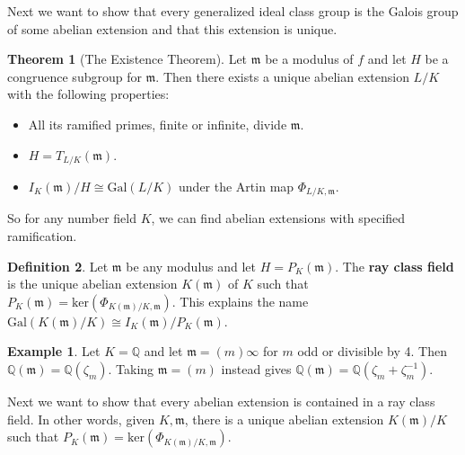 \documentclass{article}
\theoremstyle{definition}
\newtheorem{theorem}{Theorem}[section]
\newtheorem{example}{Example}[section]
\newtheorem{defn}[theorem]{Definition}
\begin{document}
Next we want to show that every generalized ideal class group is the Galois group of some abelian extension and that this extension is unique.
\begin{theorem}[The Existence Theorem]
    Let $\mathfrak{m}$ be a modulus of $f$ and let $H$ be a congruence subgroup for $\mathfrak{m}$. Then there exists a unique abelian extension $L/K$ with the following properties:
    \begin{itemize}
        \item All its ramified primes, finite or infinite, divide $\mathfrak{m}$.
        \item $H = T_{L/K}(\mathfrak{m})$.
        \item $I_K(\mathfrak{m})/H \cong \text{Gal}(L/K)$ under the Artin map $\Phi_{L/K,\mathfrak{m}}$.
    \end{itemize}
\end{theorem}
So for any number field $K$, we can find abelian extensions with specified ramification.
\begin{defn}
    Let $\mathfrak{m}$ be any modulus and let $H = P_K(\mathfrak{m})$. The \textbf{ray class field} is the unique abelian extension $K(\mathfrak{m})$ of $K$ such that $P_K(\mathfrak{m}) = \text{ker}(\Phi_{K(\mathfrak{m})/K, \mathfrak{m}})$. This explains the name $\text{Gal}(K(\mathfrak{m})/K) \cong I_K(\mathfrak{m})/P_K(\mathfrak{m})$.
\end{defn}
\begin{example}
    Let $K=\mathbb{Q}$ and let $\mathfrak{m} = (m)\infty$ for $m$ odd or divisible by 4. Then $\mathbb{Q}(\mathfrak{m}) = \mathbb{Q}(\zeta_m)$. Taking $\mathfrak{m} = (m)$ instead gives $\mathbb{Q}(\mathfrak{m}) = \mathbb{Q}(\zeta_m + \zeta_m^{-1})$.
\end{example}
Next we want to show that every abelian extension is contained in a ray class field.
In other words, given $K, \mathfrak{m}$, there is a unique abelian extension $K(\mathfrak{m})/K$ such that $P_K(\mathfrak{m}) = \text{ker}(\Phi_{K(\mathfrak{m})/K,\mathfrak{m}})$.
\end{document}
